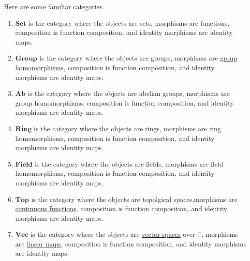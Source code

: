 	\begin{example}
	  \label{ex:basic-examples}
	  Here are some familiar categories. 
		\begin{enumerate}
		  \item $\mathbf{Set}$ is the category where the objects are sets, morphisms are functions, composition is function composition, and identity morphisms are identity maps. 
			\item $\mathbf{Group}$ is the category where the objects are groups, morphisms are \hyperref[alg-def:group-homomorphism]{group homomorphisms}, composition is function composition, and identity morphisms are identity maps. 
			\item $\mathbf{Ab}$ is the category where the objects are abelian groups, morphisms are group homomorphisms, composition is function composition, and identity morphisms are identity maps. 
			\item $\mathbf{Ring}$ is the category where the objects are rings, morphisms are ring homomorphisms, composition is function composition, and identity morphisms are identity maps. 
			\item $\mathbf{Field}$ is the category where the objects are fields, morphisms are field homomorphisms, composition is function composition, and identity morphisms are identity maps. 
			\item $\mathbf{Top}$ is the category where the objects are topolgical spaces,morphisms are \hyperref[pst-def:continuous_func]{continuous functions}, composition is function composition, and identity morphisms are identity maps. 
			\item $\mathbf{Vec}$ is the category where the objects are \hyperref[lin-def:vector-space]{vector spaces} over $\mathbb{F}$, morphisms are \hyperref[lin-def:linear_map]{linear maps}, composition is function composition, and identity morphisms are identity maps. 
		\end{enumerate}
	\end{example}

